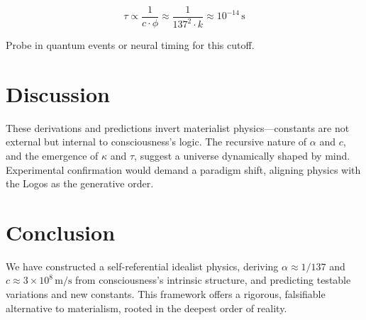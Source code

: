 \documentclass[12pt]{article}
\begin{document}
\[
\tau \propto \frac{1}{c \cdot \phi} \approx \frac{1}{137^2 \cdot k} \approx 10^{-14} \, \text{s}
\]

Probe in quantum events or neural timing for this cutoff.

\section{Discussion}

These derivations and predictions invert materialist physics—constants are not external but internal to consciousness’s logic. The recursive nature of \(\alpha\) and \(c\), and the emergence of \(\kappa\) and \(\tau\), suggest a universe dynamically shaped by mind. Experimental confirmation would demand a paradigm shift, aligning physics with the Logos as the generative order.

\section{Conclusion}

We have constructed a self-referential idealist physics, deriving \(\alpha \approx 1/137\) and \(c \approx 3 \times 10^8 \, \text{m/s}\) from consciousness’s intrinsic structure, and predicting testable variations and new constants. This framework offers a rigorous, falsifiable alternative to materialism, rooted in the deepest order of reality.
\end{document}
